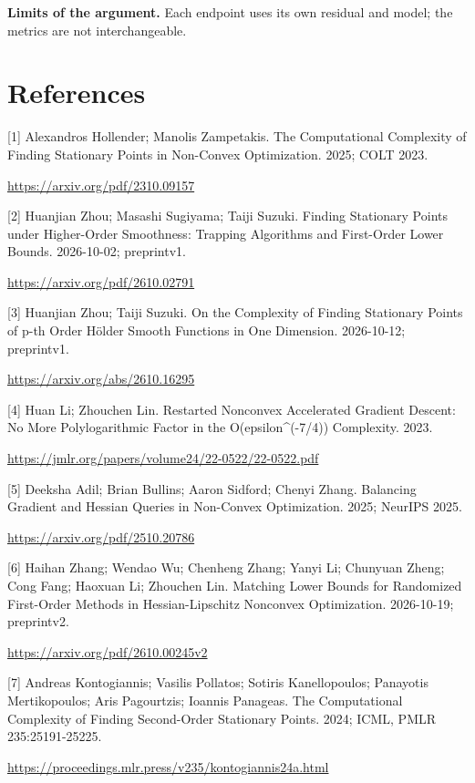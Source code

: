 \documentclass[10pt,a4paper]{article}
\begin{document}
\textbf{Limits of the argument.} Each endpoint uses its own residual and model; the metrics are not interchangeable.

\section{References}
[1] Alexandros Hollender; Manolis Zampetakis. The Computational Complexity of Finding Stationary Points in Non-Convex Optimization. 2025; COLT 2023.

\url{https://arxiv.org/pdf/2310.09157}

[2] Huanjian Zhou; Masashi Sugiyama; Taiji Suzuki. Finding Stationary Points under Higher-Order Smoothness: Trapping Algorithms and First-Order Lower Bounds. 2026-10-02; preprintv1.

\url{https://arxiv.org/pdf/2610.02791}

[3] Huanjian Zhou; Taiji Suzuki. On the Complexity of Finding Stationary Points of p-th Order Hölder Smooth Functions in One Dimension. 2026-10-12; preprintv1.

\url{https://arxiv.org/abs/2610.16295}

[4] Huan Li; Zhouchen Lin. Restarted Nonconvex Accelerated Gradient Descent: No More Polylogarithmic Factor in the O(epsilon\textasciicircum{}(-7/4)) Complexity. 2023.

\url{https://jmlr.org/papers/volume24/22-0522/22-0522.pdf}

[5] Deeksha Adil; Brian Bullins; Aaron Sidford; Chenyi Zhang. Balancing Gradient and Hessian Queries in Non-Convex Optimization. 2025; NeurIPS 2025.

\url{https://arxiv.org/pdf/2510.20786}

[6] Haihan Zhang; Wendao Wu; Chenheng Zhang; Yanyi Li; Chunyuan Zheng; Cong Fang; Haoxuan Li; Zhouchen Lin. Matching Lower Bounds for Randomized First-Order Methods in Hessian-Lipschitz Nonconvex Optimization. 2026-10-19; preprintv2.

\url{https://arxiv.org/pdf/2610.00245v2}

[7] Andreas Kontogiannis; Vasilis Pollatos; Sotiris Kanellopoulos; Panayotis Mertikopoulos; Aris Pagourtzis; Ioannis Panageas. The Computational Complexity of Finding Second-Order Stationary Points. 2024; ICML, PMLR 235:25191-25225.

\url{https://proceedings.mlr.press/v235/kontogiannis24a.html}
\end{document}
